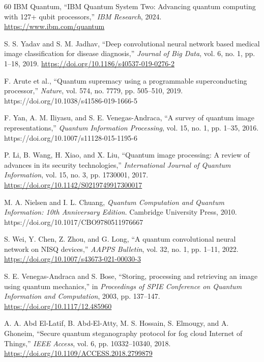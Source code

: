 \documentclass[11pt,a4paper]{article}
\begin{document}
\begin{thebibliography}{60}
IBM Quantum, ``IBM Quantum System Two: Advancing quantum computing with 127+ qubit processors,'' \textit{IBM Research}, 2024. \url{https://www.ibm.com/quantum}

S. S. Yadav and S. M. Jadhav, ``Deep convolutional neural network based medical image classification for disease diagnosis,'' \textit{Journal of Big Data}, vol. 6, no. 1, pp. 1--18, 2019. \url{https://doi.org/10.1186/s40537-019-0276-2}

F. Arute et al., ``Quantum supremacy using a programmable superconducting processor,'' \textit{Nature}, vol. 574, no. 7779, pp. 505--510, 2019. https://doi.org/10.1038/s41586-019-1666-5

F. Yan, A. M. Iliyasu, and S. E. Venegas-Andraca, ``A survey of quantum image representations,'' \textit{Quantum Information Processing}, vol. 15, no. 1, pp. 1--35, 2016. https://doi.org/10.1007/s11128-015-1195-6

P. Li, B. Wang, H. Xiao, and X. Liu, ``Quantum image processing: A review of advances in its security technologies,'' \textit{International Journal of Quantum Information}, vol. 15, no. 3, pp. 1730001, 2017. \url{https://doi.org/10.1142/S0219749917300017}

M. A. Nielsen and I. L. Chuang, \textit{Quantum Computation and Quantum Information: 10th Anniversary Edition}. Cambridge University Press, 2010. https://doi.org/10.1017/CBO9780511976667

S. Wei, Y. Chen, Z. Zhou, and G. Long, ``A quantum convolutional neural network on NISQ devices,'' \textit{AAPPS Bulletin}, vol. 32, no. 1, pp. 1--11, 2022. \url{https://doi.org/10.1007/s43673-021-00030-3}

S. E. Venegas-Andraca and S. Bose, ``Storing, processing and retrieving an image using quantum mechanics,'' in \textit{Proceedings of SPIE Conference on Quantum Information and Computation}, 2003, pp. 137--147. \url{https://doi.org/10.1117/12.485960}

A. A. Abd El-Latif, B. Abd-El-Atty, M. S. Hossain, S. Elmougy, and A. Ghoneim, ``Secure quantum steganography protocol for fog cloud Internet of Things,'' \textit{IEEE Access}, vol. 6, pp. 10332--10340, 2018. \url{https://doi.org/10.1109/ACCESS.2018.2799879}


\end{thebibliography}
\end{document}
